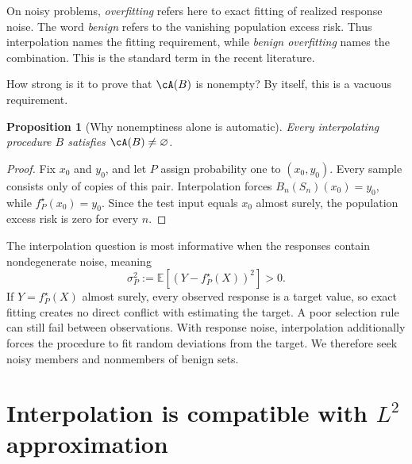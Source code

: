 \documentclass[11pt,twoside]{article}
\newcommand{\E}{\mathbb E}
\newtheorem{proposition}[theorem]{Proposition}
\theoremstyle{definition}
\theoremstyle{remark}
\begin{document}
On noisy problems, \emph{overfitting} refers here to exact fitting of realized
response noise. The word \emph{benign} refers to the vanishing population
excess risk. Thus interpolation names the fitting requirement, while
\emph{benign overfitting} names the combination. This is the standard term in
the recent literature.%

How strong is it to prove that $\cA(B)$ is nonempty? By itself, this is a
vacuous requirement.

\begin{proposition}[Why nonemptiness alone is automatic]
\label{prop:automatic-nonempty}
Every interpolating procedure $B$ satisfies $\cA(B)\ne\varnothing$.
\end{proposition}

\begin{proof}
Fix $x_0$ and $y_0$, and let $P$ assign probability one to $(x_0,y_0)$.
Every sample consists only of copies of this pair. Interpolation forces
$B_n(S_n)(x_0)=y_0$, while $f_P^\star(x_0)=y_0$. Since the test input equals
$x_0$ almost surely, the population excess risk is zero for every $n$.
\end{proof}

The interpolation question is most informative when the responses contain
nondegenerate noise, meaning
\[
 \sigma_P^2:=\E[(Y-f_P^\star(X))^2]>0.
\]
If $Y=f_P^\star(X)$ almost surely, every observed response is a target value,
so exact fitting creates no direct conflict with estimating the target. A poor
selection rule can still fail between observations. With response noise,
interpolation additionally forces the procedure to fit random deviations from
the target. We therefore seek noisy members and nonmembers of benign sets.

\section{Interpolation is compatible with \texorpdfstring{$L^2$}{L2} approximation}
\label{sec:point-corrections}
\end{document}
